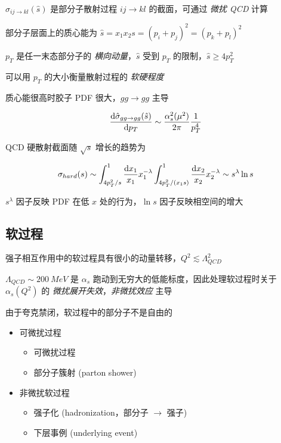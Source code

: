 $\hat{\sigma}_{ij \to kl}(\hat{s})$ 是部分子散射过程 $ij \to kl$ 的截面，可通过 \emph{微扰 QCD} 计算

部分子层面上的质心能为 $\hat{s} = x_1 x_2 s = (p_i+p_j)^2 = (p_k+p_l)^2$

$p_T$ 是任一末态部分子的 \emph{横向动量}，$\hat{s}$ 受到 $p_T$ 的限制，$\hat{s} \ge 4 p_T^2$

可以用 $p_T$ 的大小衡量散射过程的 \emph{软硬程度}

质心能很高时胶子 PDF 很大，$gg \to gg$ 主导

\begin{equation}
    \frac{\mathop{}\!\mathrm{d}\hat{\sigma}_{gg \to gg}(\hat{s})}{\mathop{}\!\mathrm{d} p_T} \sim \frac{\alpha_s^2(\mu^2)}{2\pi}  \frac{1}{p_T^4}
\end{equation}

QCD 硬散射截面随 $\sqrt{s}$ 增长的趋势为

\begin{equation}
    \sigma_{hard}(s) \sim \int_{4 p_T^2/s}^1 \frac{\mathop{}\!\mathrm{d} x_1}{x_1} x_1^{-\lambda} \int_{4 p_T^2/(x_1 s)}^1 \frac{\mathop{}\!\mathrm{d} x_2}{x_2} x_2^{-\lambda} \sim s^\lambda \ln s
\end{equation}

$s^\lambda$ 因子反映 PDF 在低 $x$ 处的行为，$\ln s$ 因子反映相空间的增大

\subsection{软过程}

强子相互作用中的软过程具有很小的动量转移，$Q^2 \lesssim \Lambda^2_{QCD}$

$\Lambda_{QCD} \sim 200\ MeV$ 是 $\alpha_s$ 跑动到无穷大的低能标度，因此处理软过程时关于 $\alpha_s(Q^2)$ 的 \emph{微扰展开失效}，\emph{非微扰效应} 主导

由于夸克禁闭，软过程中的部分子不是自由的

\begin{itemize}
    \item 可微扰过程
        \begin{itemize}
            \item 可微扰过程
            \item 部分子簇射 (parton shower)
        \end{itemize}
    \item 非微扰软过程
        \begin{itemize}
            \item 强子化 (hadronization，部分子 $\to$ 强子)
            \item 下层事例 (underlying event)
        \end{itemize}
\end{itemize}

